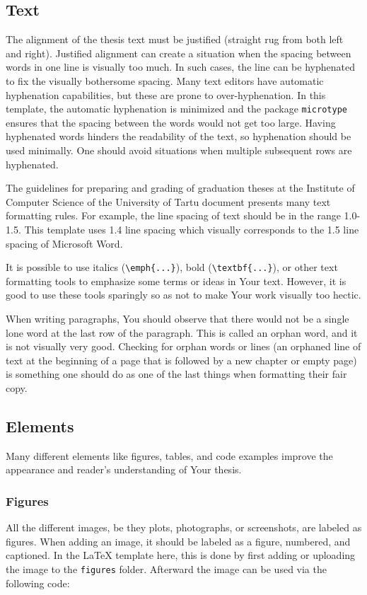 \subsection{Text}
The alignment of the thesis text must be justified (straight rug from both left and right). Justified alignment can create a situation when the spacing between words in one line is visually too much. In such cases, the line can be hyphenated to fix the visually bothersome spacing. Many text editors have automatic hyphenation capabilities, but these are prone to over-hyphenation. In this template, the automatic hyphenation is minimized and the package \verb|microtype| ensures that the spacing between the words would not get too large. Having hyphenated words hinders the readability of the text, so hyphenation should be used minimally. One should avoid situations when multiple subsequent rows are hyphenated.

The guidelines for preparing and grading of graduation theses at the Institute of Computer Science of the University of Tartu document presents many text formatting rules. For example, the line spacing of text should be in the range 1.0-1.5. This template uses 1.4 line spacing which visually corresponds to the 1.5 line spacing of Microsoft Word.

It is possible to use italics (\verb|\emph{...}|), bold (\verb|\textbf{...}|), or other text formatting tools to emphasize some terms or ideas in Your text. However, it is good to use these tools sparingly so as not to make Your work visually too hectic.

When writing paragraphs, You should observe that there would not be a single lone word at the last row of the paragraph. This is called an orphan word, and it is not visually very good. Checking for orphan words or lines (an orphaned line of text at the beginning of a page that is followed by a new chapter or empty page) is something one should do as one of the last things when formatting their fair copy.

\subsection{Elements}
Many different elements like figures, tables, and code examples improve the appearance and reader’s understanding of Your thesis.

\subsubsection{Figures}
All the different images, be they plots, photographs, or screenshots, are labeled as figures. When adding an image, it should be labeled as a figure, numbered, and captioned. In the LaTeX template here, this is done by first adding or uploading the image to the \verb|figures| folder. Afterward the image can be used via the following code:

